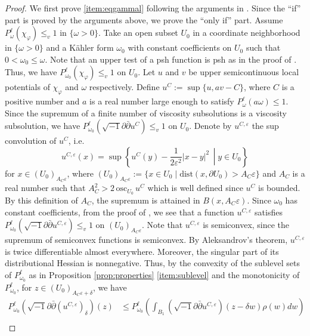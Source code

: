 \documentclass[10pt,a4paper]{amsart}
\numberwithin{equation}{section}
\newcommand{\delb}{\sqrt{-1}\partial\bar{\partial}}
\newcommand{\relmiddle}[1]{\mathrel{}\middle#1\mathrel{}}
\begin{document}
    \begin{proof}
        We first prove \ref{item:eqgammal} following the arguments in \cite[Proposition 1.11 and Theorem 1.9]{EGZ}. Since the ``if'' part is proved by the arguments above, we prove the ``only if'' part. Assume $P^\ell_\omega(\chi_\varphi)\le_v 1$ in $\{\omega>0\}$.
        Take an open subset $U_0$ in a coordinate neighborhood in $\{\omega>0\}$ and a K{\"a}hler form $\omega_0$ with constant coefficients on $U_0$ such that $0<\omega_0\le\omega$. Note that an upper test of a psh function is psh as in the proof of \cite[Proposition 1.3]{EGZ}. Thus, we have $P^\ell_{\omega_0}(\chi_\varphi)\le_v 1$ on $U_0$. Let $u$ and $v$ be upper semicontinuous local potentials of $\chi_\varphi$ and $\omega$ respectively. Define $u^C:=\sup\{u,av-C\}$, where $C$ is a positive number and $a$ is a real number large enough to satisfy $P^\ell_\omega(a\omega)\le 1$. Since the supremum of a finite number of viscosity subsolutions is a viscosity subsolution, we have $P^\ell_{\omega_0}(
        \delb u^C)\le_v 1$ on $U_0$. Denote by $u^{C,\varepsilon}$ the sup convolution of $u^C$, i.e.
        $$u^{C,\varepsilon}(x) = \sup \left\{ u^C(y)-\frac{1}{2\varepsilon^2}|x-y|^2 \, \relmiddle{|} y \in U_0 \right\}$$
        for $x\in (U_0)_{A_C \varepsilon}$, where $(U_0)_{A_C \varepsilon}:=\{x\in U_0\mid \mathrm{dist}(x,\partial U_0)>A_C \varepsilon\}$ and $A_C$ is a real number such that $A_C^2>2\, \mathrm{osc}_{U_0} \, u^C$ which is well defined since $u^C$ is bounded. By this definition of $A_C$, the supremum is attained in $B(x, A_C \varepsilon)$.
        Since $\omega_0$ has constant coefficients, from the proof of \cite[Proposition 4.2]{Ishii}, we see that a function $u^{C,\varepsilon}$ satisfies $P^\ell_{\omega_0}(\delb u^{C,\varepsilon})\le_v 1$ on $(U_0)_{A_C\varepsilon}$.
        Note that $u^{C,\varepsilon}$ is semiconvex, since the supremum of semiconvex functions is semiconvex. By Aleksandrov's theorem, $u^{C,\varepsilon}$ is twice differentiable almost everywhere. Moreover, the singular part of its distributional Hessian is nonnegative. Thus, by the convexity of the sublevel sets of $P^\ell_{\omega_0}$ as in Proposition \ref{prop:properties} \ref{item:sublevel} and the monotonicity of $P^\ell_{\omega_0}$, for $z \in (U_0)_{A_C\varepsilon+\delta}$, we have
        \begin{equation}\label{eq:supconv}
        \begin{aligned}
        P^\ell_{\omega_0}(\delb(u^{C,\varepsilon})_\delta) (z)&\le P^\ell_{\omega_0}\left(\int_{B_1} (\delb u^{C,\varepsilon})(z-\delta w)\rho(w)dw\right)\\

\end{aligned}
\end{equation}
\end{proof}
\end{document}
